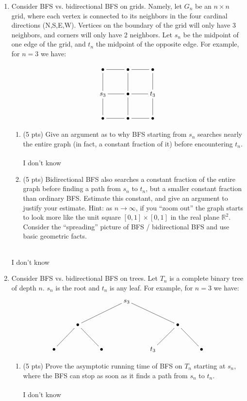 \documentclass[12pt]{article}
\begin{document}
\begin{enumerate}
\begin{enumerate}
	\item \label{1c} Consider BFS vs. bidirectional BFS on grids. Namely, let $G_n$ be an $n \times n$ grid, where each vertex is connected to its neighbors in the four cardinal directions (N,S,E,W). Vertices on the boundary of the grid will only have 3 neighbors, and corners will only have 2 neighbors. Let $s_n$ be the midpoint of one edge of the grid, and $t_n$ the midpoint of the opposite edge. For example, for $n=3$ we have:
	
	\[
\xymatrix{
\bullet \ar@{-}[r] \ar@{-}[d] & \bullet \ar@{-}[r] \ar@{-}[d] & \bullet \ar@{-}[d] \\ 
s_3 \ar@{-}[r] \ar@{-}[d] & \bullet \ar@{-}[r] \ar@{-}[d] & t_3 \ar@{-}[d] \\ 
\bullet \ar@{-}[r] & \bullet \ar@{-}[r] & \bullet
}
\]

	\begin{enumerate}
	\item (5 pts) Give an argument as to why BFS starting from $s_n$ searches nearly the entire graph (in fact, a constant fraction of it) before encountering $t_n$. 
	\\ \\ I don't know
	\pagebreak
	
	\item (5 pts) Bidirectional BFS also searches a constant fraction of the entire graph before finding a path from $s_n$ to $t_n$, but a smaller constant fraction than ordinary BFS. Estimate this constant, and give an argument to justify your estimate. Hint: as $n \to \infty$, if you ``zoom out'' the graph starts to look more like the unit square $[0,1] \times [0,1]$ in the real plane $\mathbb{R}^2$. Consider the ``spreading'' picture of BFS / bidirectional BFS and use basic geometric facts.  \\ \\
	\end{enumerate}
	I don't know
	\pagebreak
	
	\item \label{1d} Consider BFS vs. bidirectional BFS on trees. Let $T_n$ is a complete binary tree of depth $n$. $s_n$ is the root and $t_n$ is any leaf. For example, for $n=3$ we have:
	\[
	\xymatrix{
 	   & & & s_3 \ar@{-}[lld] \ar@{-}[rrd] \\ 
	  & \bullet \ar@{-}[dr] \ar@{-}[dl] & & & & \bullet \ar@{-}[dr] \ar@{-}[dl] \\
	\bullet & & \bullet & & t_3 & & \bullet
	}
	\]
	
	\begin{enumerate}
	\item (5 pts) Prove the asymptotic running time of BFS on $T_n$ starting at $s_n$, where the BFS can stop as soon as it finds a path from $s_n$ to $t_n$.
	\\ \\ I don't know
	\pagebreak


\end{enumerate}
\end{enumerate}
\end{enumerate}
\end{document}
